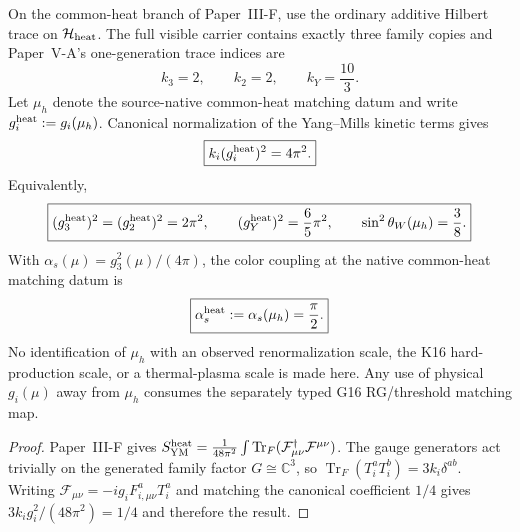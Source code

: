 \documentclass[12pt,a4paper]{article}
\begin{document}
\begin{corollary}
\label{p5:cor:common-heat-absolute-gauge-normalization}
On the common-heat branch of Paper~III-F, use the ordinary additive Hilbert
trace on $\mathcal H_{\rm heat}$.  The full visible carrier contains exactly
three family copies and Paper~V-A's one-generation trace indices are
\[
 k_3=2,\qquad k_2=2,\qquad k_Y=\frac{10}{3}.
\]
Let \(\mu_h\) denote the source-native common-heat matching datum and write
\(g_i^{\rm heat}:=g_i(\mu_h)\).  Canonical normalization of the Yang--Mills
kinetic terms gives
\[
 \boxed{k_i (g_i^{\rm heat})^2=4\pi^2.}
\]
Equivalently,
\[
 \boxed{
 (g_3^{\rm heat})^2=(g_2^{\rm heat})^2=2\pi^2,
 \qquad
 (g_Y^{\rm heat})^2=\frac65\pi^2,
 \qquad
 \sin^2\theta_W(\mu_h)=\frac38.}
\]
With $\alpha_s(\mu)=g_3^2(\mu)/(4\pi)$, the color coupling at the native
common-heat matching datum is
\[
 \boxed{\alpha_s^{\rm heat}:=\alpha_s(\mu_h)=\frac\pi2.}
\]
No identification of \(\mu_h\) with an observed renormalization scale, the
K16 hard-production scale, or a thermal-plasma scale is made here.  Any use of
physical \(g_i(\mu)\) away from \(\mu_h\) consumes the separately typed
G16 RG/threshold matching map.
\end{corollary}

\begin{proof}
Paper~III-F gives
$S_{\rm YM}^{\rm heat}=\frac1{48\pi^2}
\int\operatorname{Tr}_{F}(\mathcal F_{\mu\nu}^\dagger
\mathcal F^{\mu\nu})$.
The gauge generators act trivially on the generated family factor
$G\cong\mathbb C^3$, so
$\operatorname{Tr}_{F}(T_i^aT_i^b)=3k_i\delta^{ab}$.
Writing $\mathcal F_{\mu\nu}=-ig_iF^a_{i,\mu\nu}T_i^a$ and matching the
canonical coefficient $1/4$ gives
$3k_ig_i^2/(48\pi^2)=1/4$ and therefore the result.
\end{proof}
\end{document}
